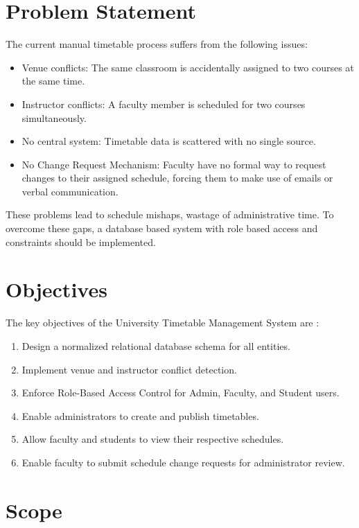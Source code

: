 \documentclass[12pt, a4paper]{report}
\begin{document}
\section{Problem Statement}

The current manual timetable process suffers from the following issues:

\begin{itemize}
    \item Venue conflicts: The same classroom is accidentally assigned to two courses at the same time.
    \item Instructor conflicts: A faculty member is scheduled for two courses simultaneously.
    \item No central system: Timetable data is scattered with no single source.
    \item No Change Request Mechanism: Faculty have no formal way to request changes to their assigned schedule, forcing them to make use of emails or verbal communication.
\end{itemize}

These problems lead to schedule mishaps, wastage of administrative time. To overcome these gaps, a database based system with role based access and constraints should be implemented.

\section{Objectives}
The key objectives of the University Timetable Management System are \cite{srs}:

\begin{enumerate}
    \item Design a normalized relational database schema for all entities.
    \item Implement venue and instructor conflict detection.
    \item Enforce Role-Based Access Control for Admin, Faculty, and Student users.
    \item Enable administrators to create and publish timetables.
    \item Allow faculty and students to view their respective schedules.
    \item Enable faculty to submit schedule change requests for administrator review.
\end{enumerate}

\section{Scope}
\end{document}
